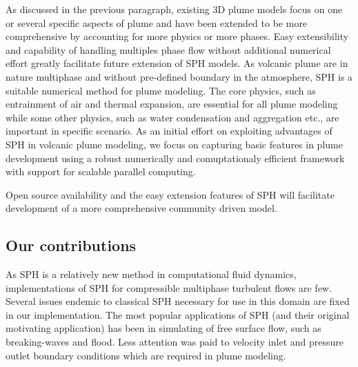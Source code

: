 \documentclass[journal abbreviation, manuscript]{copernicus}
\begin{document}
As discussed in the previous paragraph, existing 3D plume models focus on one or several specific aspects of plume and have been extended to be more comprehensive by accounting for more physics or more phases. Easy extensibility and capability of handling multiples phase flow without additional numerical effort greatly facilitate future extension of SPH models. As volcanic plume are in nature multiphase and without pre-defined boundary in the atmosphere, SPH is a suitable numerical method for plume modeling. The core physics, such as entrainment of air and thermal expansion, are essential for all plume modeling while some other physics, such as water condensation and aggregation etc., are important in specific scenario. As an initial effort on exploiting advantages of SPH in volcanic plume modeling, we focus on capturing basic features in plume development using a robust numerically and comuptationaly efficient framework with support for scalable parallel computing. %

Open source availability and  the easy extension features of SPH will facilitate development of a more comprehensive community driven model.

\subsection{Our contributions}
As SPH is a relatively new method in computational fluid dynamics, implementations of SPH for compressible multiphase turbulent flows are few. Several issues endemic to classical SPH necessary for use in this domain are fixed in our implementation. The most popular applications of SPH (and their original motivating application) has been in simulating of free surface flow, such as breaking-waves and flood. Less attention was paid to velocity inlet and pressure outlet boundary conditions which are required in plume modeling.
 
\end{document}
